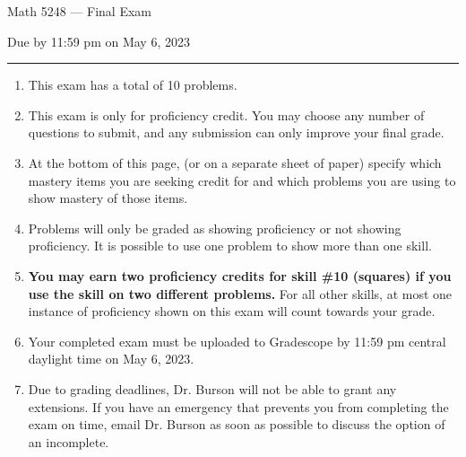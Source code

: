 \documentclass[11pt,addpoints,letterpaper]{exam}
\begin{document}
\vspace*{-0.5in}

\ifprintanswers
\begin{center}
\end{center}
\fi

{\centering

\LARGE Math 5248 --- Final Exam

}

\smallskip

{\centering

\large Due by 11:59 pm on May 6, 2023

}

\bigskip\bigskip


\hrule

\begin{enumerate}[leftmargin=2em,rightmargin=1em]\setlength{\itemsep}{-2pt}


\item This exam has a total of 10 problems. 

\item This exam is only for proficiency credit. You may choose any number of questions to submit, and any submission can only improve your final grade. 

\item At the bottom of this page, (or on a separate sheet of paper) specify which mastery items you are seeking credit for and which problems you are using to show mastery of those items. 

\item Problems will only be graded as showing proficiency or not showing proficiency.  It is possible to use one problem to show more than one skill. 

\item \textbf{You may earn two proficiency credits for skill \#10 (squares) if you use the skill on two different problems.} For all other skills, at most one instance of proficiency shown on this exam will count towards your grade. 

\item Your completed exam must be uploaded to Gradescope by 11:59 pm central daylight time on May 6, 2023. 

\item Due to grading deadlines, Dr. Burson will not be able to grant any extensions. If you have an emergency that prevents you from completing the exam on time, email Dr. Burson as soon as possible to discuss the option of an incomplete. 



\end{enumerate}
\end{document}
